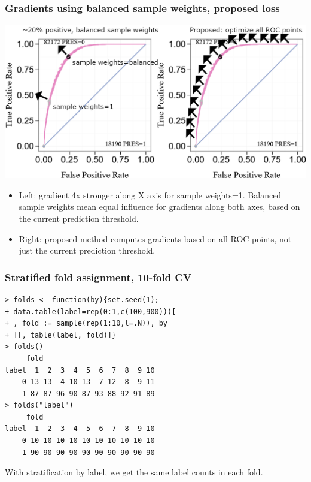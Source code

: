\documentclass[t]{beamer}
\begin{document}
\begin{frame}
  \frametitle{Gradients using balanced sample weights, proposed loss}
  \includegraphics[width=\textwidth]{roc-gradient-arrows-proposed}
  \begin{itemize}
  \item Left: gradient 4x
    stronger along X axis for sample weights=1. Balanced sample
    weights mean equal influence for gradients along both axes, based on the current prediction threshold.
  \item Right: proposed method computes gradients based on all ROC
    points, not just the current prediction threshold.
  \end{itemize}
\end{frame}

\begin{frame}[fragile]
  \frametitle{Stratified fold assignment, 10-fold CV}

\begin{verbatim}
> folds <- function(by){set.seed(1);
+ data.table(label=rep(0:1,c(100,900)))[
+ , fold := sample(rep(1:10,l=.N)), by
+ ][, table(label, fold)]}
> folds()
     fold
label  1  2  3  4  5  6  7  8  9 10
    0 13 13  4 10 13  7 12  8  9 11
    1 87 87 96 90 87 93 88 92 91 89
> folds("label")
     fold
label  1  2  3  4  5  6  7  8  9 10
    0 10 10 10 10 10 10 10 10 10 10
    1 90 90 90 90 90 90 90 90 90 90
\end{verbatim}

  With stratification by label, we get the same label counts in each
  fold.

\end{frame}
\end{document}
